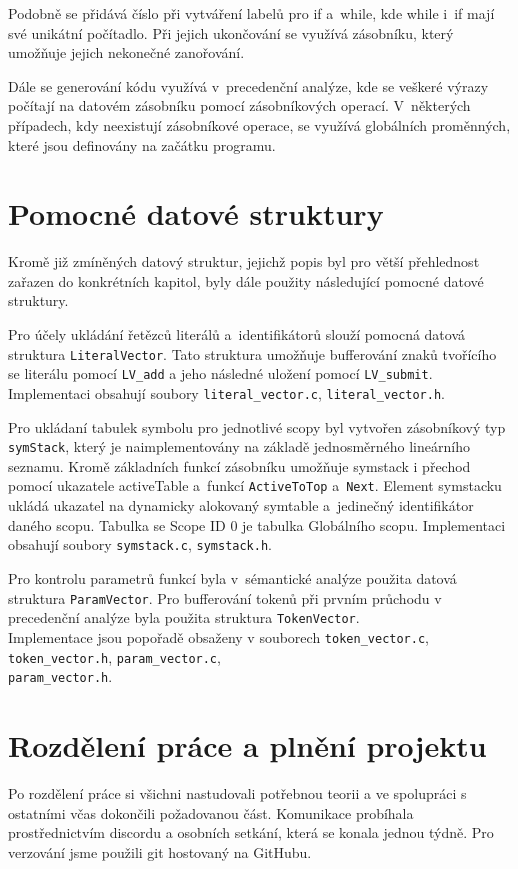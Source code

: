 \documentclass[11pt]{article}
\begin{document}
Podobně se přidává číslo při vytváření labelů pro if a~while, kde while i~if mají své unikátní počítadlo.
Při jejich ukončování se využívá zásobníku, který umožňuje jejich nekonečné zanořování.


Dále se generování kódu využívá v~precedenční analýze, kde se veškeré výrazy počítají na datovém zásobníku pomocí zásobníkových operací.
V~některých případech, kdy neexistují zásobníkové operace, se využívá globálních proměnných, které jsou definovány na začátku programu.


\section{Pomocné datové struktury}

Kromě již zmíněných datový struktur, jejichž popis byl pro větší přehlednost zařazen do
konkrétních kapitol, byly dále použity následující pomocné datové struktury.

Pro účely ukládání řetězců literálů a~identifikátorů slouží pomocná datová struktura \texttt{LiteralVector}.
Tato struktura umožňuje bufferování znaků tvořícího se literálu pomocí
\texttt{LV\_add} a jeho následné uložení pomocí \texttt{LV\_submit}.
Implementaci obsahují soubory \texttt{literal\_vector.c}, \texttt{literal\_vector.h}.

Pro ukládaní tabulek symbolu pro jednotlivé scopy byl vytvořen zásobníkový typ \texttt{symStack},
který je naimplementovány na základě jednosměrného lineárního seznamu. Kromě základních funkcí
zásobníku umožňuje symstack i přechod pomocí ukazatele activeTable a~funkcí \texttt{ActiveToTop} a~\texttt{Next}.
Element symstacku ukládá ukazatel na dynamicky alokovaný symtable a~jedinečný identifikátor daného scopu.
Tabulka se Scope ID 0 je tabulka Globálního scopu.
Implementaci obsahují soubory \texttt{symstack.c}, \texttt{symstack.h}.

Pro kontrolu parametrů funkcí byla v~sémantické analýze použita datová struktura \texttt{ParamVector}.
Pro bufferování tokenů při prvním průchodu v precedenční analýze byla použita struktura \texttt{TokenVector}.\\
Implementace jsou popořadě obsaženy v souborech
\texttt{token\_vector.c}, \texttt{token\_vector.h}, \texttt{param\_vector.c}, \\ \texttt{param\_vector.h}.




\section{Rozdělení práce a plnění projektu}
Po rozdělení práce si všichni nastudovali potřebnou teorii a ve spolupráci s ostatními včas
dokončili požadovanou část. Komunikace probíhala prostřednictvím discordu a osobních setkání,
která se konala jednou týdně. Pro verzování jsme použili git hostovaný na GitHubu. 
\end{document}
